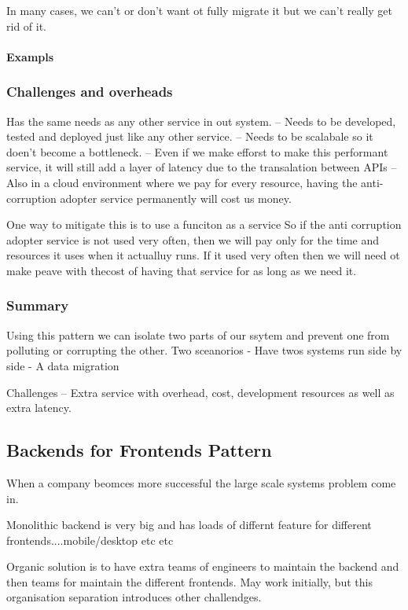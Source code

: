 \documentclass[a4paper, 11pt]{book}
\begin{document}
{    In many cases, we can't or don't want ot fully migrate it but we can't really get rid of it.

    \paragraph{Exampls}

    \subsubsection{Challenges and overheads}
    Has the same needs as any other service in out system.
    -- Needs to be developed, tested and deployed just like any other service.
    -- Needs to be scalabale so it doen't become a bottleneck.
    -- Even if we make efforst to make this performant service, it will still add a layer of latency due to the transalation between APIs
    -- Also in a cloud environment where we pay for every resource, having the anti-corruption adopter service permanently will cost us money.

    One way to mitigate this is to use a funciton as a service
    So if the anti corruption adopter service is not used very often, then we will pay only for the time and resources it uses when it actualluy runs.
    If it used very often then we will need ot make peave with thecost of having that service for as long as we need it.

    \subsubsection{Summary}
    Using this pattern we can isolate two parts of our ssytem and prevent one from polluting or corrupting the other.
    Two sceanorios
    - Have twos systems run side by side
    - A data migration

    Challenges
    -- Extra service with overhead, cost, development resources as well as extra latency.

    \subsection{Backends for Frontends Pattern}
    When a company beomces more successful the large scale systems problem come in.

    Monolithic backend is very big and has loads of differnt feature for different frontends....mobile/desktop etc etc

    Organic solution is to have extra teams of engineers to maintain the backend and then teams for maintain the different frontends.
    May work initially, but this organisation separation introduces other challendges.

}
\end{document}
